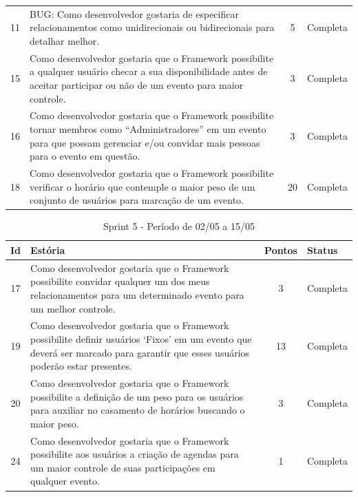 \begin{apendicesenv}
\begin{table}[!h]
\begin{adjustbox}{width=\textwidth}
\begin{tabular}{@{}cp{10cm}cl@{}}
11 & BUG: Como desenvolvedor gostaria de especificar relacionamentos como unidirecionais ou bidirecionais para detalhar melhor. & 5 & Completa \\

15 & Como desenvolvedor gostaria que o Framework possibilite a qualquer usuário checar a sua disponibilidade antes de aceitar participar ou não de um evento para maior controle. & 3 & Completa \\

16 & Como desenvolvedor gostaria que o Framework possibilite tornar membros como ``Administradores'' em um evento para que possam gerenciar e/ou convidar mais pessoas para o evento em questão. & 3 & Completa \\

18 & Como desenvolvedor gostaria que o Framework possibilite verificar o horário que contemple o maior peso de um conjunto de usuários para marcação de um evento. & 20 & Completa \\ \bottomrule
\end{tabular}
\end{adjustbox}
\end{table}

\begin{table}[!h]
\centering
\caption{Sprint 5 - Período de 02/05 a 15/05}
\label{sprint_5}
\begin{adjustbox}{width=\textwidth}
\begin{tabular}{@{}cp{10cm}cl@{}}
\toprule
\textbf{Id}  & \textbf{Estória} & \textbf{Pontos} & \textbf{Status} \\ \midrule
17 & Como desenvolvedor gostaria que o Framework possibilite convidar qualquer um dos meus relacionamentos para um determinado evento para um melhor controle. & 3 & Completa \\

19 & Como desenvolvedor gostaria que o Framework possibilite definir usuários `Fixos' em um evento que deverá ser marcado para garantir que esses usuários poderão estar presentes. & 13 & Completa \\

20 & Como desenvolvedor gostaria que o Framework possibilite a definição de um peso para os usuários para auxiliar no casamento de horários buscando o maior peso. & 3 & Completa \\

24 & Como desenvolvedor gostaria que o Framework possibilite aos usuários a criação de agendas para um maior controle de suas participações em qualquer evento. & 1 & Completa \\


\end{tabular}
\end{adjustbox}
\end{table}
\end{apendicesenv}
